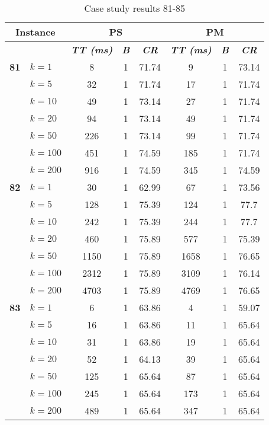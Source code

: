     \begin{table}[htbp]
    \caption{Case study results 81-85}
    \centering
    \begin{tabular}{|l|l|c|c|c|c|c|c|}
    \hline
    \multicolumn{ 2}{|c|}{\textbf{Instance}} & \multicolumn{ 3}{c|}{\textbf{PS}} & \multicolumn{ 3}{c|}{\textbf{PM}} \\ \hline
    \multicolumn{ 2}{|l|}{} & \textbf{\textit{TT (ms)}} & \textbf{\textit{B}} & \textbf{\textit{CR}} & \textbf{\textit{TT (ms)}} & \textbf{\textit{B}} & \textbf{\textit{CR}} \\ \hline
    \multicolumn{1}{|r|}{\textbf{81}} & $k=1$ & 8 & 1 & 71.74 & 9 & 1 & 73.14 \\ 
     & $k=5$ & 32 & 1 & 71.74 & 17 & 1 & 71.74 \\ 
     & $k=10$ & 49 & 1 & 73.14 & 27 & 1 & 71.74 \\ 
     & $k=20$ & 94 & 1 & 73.14 & 49 & 1 & 71.74 \\ 
     & $k=50$ & 226 & 1 & 73.14 & 99 & 1 & 71.74 \\ 
     & $k=100$ & 451 & 1 & 74.59 & 185 & 1 & 71.74 \\ 
     & $k=200$ & 916 & 1 & 74.59 & 345 & 1 & 74.59 \\ \hline
    \multicolumn{1}{|r|}{\textbf{82}} & $k=1$ & 30 & 1 & 62.99 & 67 & 1 & 73.56 \\ 
     & $k=5$ & 128 & 1 & 75.39 & 124 & 1 & 77.7 \\ 
     & $k=10$ & 242 & 1 & 75.39 & 244 & 1 & 77.7 \\ 
     & $k=20$ & 460 & 1 & 75.89 & 577 & 1 & 75.39 \\ 
     & $k=50$ & 1150 & 1 & 75.89 & 1658 & 1 & 76.65 \\ 
     & $k=100$ & 2312 & 1 & 75.89 & 3109 & 1 & 76.14 \\ 
     & $k=200$ & 4703 & 1 & 75.89 & 4769 & 1 & 76.65 \\ \hline
    \multicolumn{1}{|r|}{\textbf{83}} & $k=1$ & 6 & 1 & 63.86 & 4 & 1 & 59.07 \\ 
     & $k=5$ & 16 & 1 & 63.86 & 11 & 1 & 65.64 \\ 
     & $k=10$ & 31 & 1 & 63.86 & 19 & 1 & 65.64 \\ 
     & $k=20$ & 52 & 1 & 64.13 & 39 & 1 & 65.64 \\ 
     & $k=50$ & 125 & 1 & 65.64 & 87 & 1 & 65.64 \\ 
     & $k=100$ & 245 & 1 & 65.64 & 173 & 1 & 65.64 \\ 
     & $k=200$ & 489 & 1 & 65.64 & 347 & 1 & 65.64 \\ \hline

\end{tabular}
\end{table}

